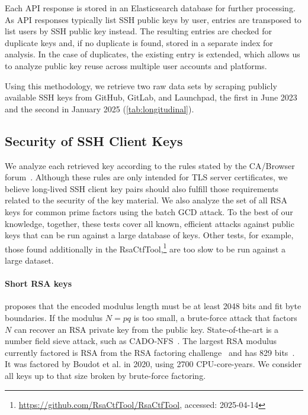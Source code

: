Each API response is stored in an Elasticsearch database for further processing. As API responses typically list SSH public keys by user, entries are transposed to list users by SSH public key instead. The resulting entries are checked for duplicate keys and, if no duplicate is found, stored in a separate index for analysis. In the case of duplicates, the existing entry is extended, which allows us to analyze public key reuse across multiple user accounts and platforms.

Using this methodology, we retrieve two raw data sets by scraping publicly available SSH keys from GitHub, GitLab, and Launchpad, the first in June 2023 and the second in January 2025 (\autoref{tab:longitudinal}).

\subsection{Security of SSH Client Keys}
\label{subsec:securitykeys}

We analyze each retrieved key according to the rules stated by the CA/Browser forum~\cite[Sections 6.1.1.3, 6.1.5, 6.1.6]{ca-browser-forum-2.1.2}. Although these rules are only intended for TLS server certificates, we believe long-lived SSH client key pairs should also fulfill those requirements related to the security of the key material. We also analyze the set of all RSA keys for common prime factors using the batch GCD attack. To the best of our knowledge, together, these tests cover all known, efficient attacks against public keys that can be run against a large database of keys. Other tests, for example, those found additionally in the RsaCtfTool,\footnote{\url{https://github.com/RsaCtfTool/RsaCtfTool}, accessed: 2025-04-14} are too slow to be run against a large dataset.

\paragraph{Short RSA keys}

\cite[Section 6.1.5]{ca-browser-forum-2.1.2} proposes that the encoded modulus length must be at least 2048 bits and fit byte boundaries. If the modulus $N=pq$ is too small, a brute-force attack that factors $N$ can recover an RSA private key from the public key. State-of-the-art is a number field sieve attack, such as CADO\nobreakdashes-NFS~\cite{cadonfs}. The largest RSA modulus currently factored is RSA from the RSA factoring challenge~\cite{rsachallenge} and has 829 bits~\cite{boudot2020}. It was factored by Boudot et al. in 2020, using 2700 CPU-core-years. We consider all keys up to that size broken by brute-force factoring.

